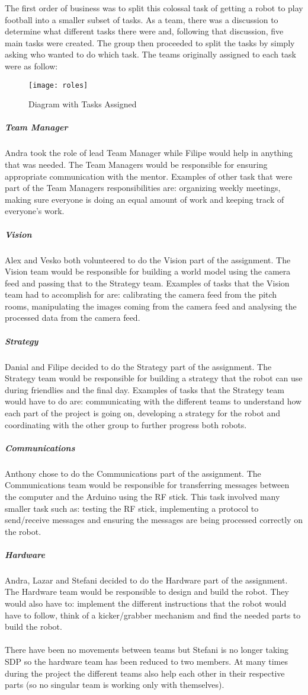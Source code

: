 The first order of business was to split this colossal task of getting a robot to play football into a smaller subset of tasks. As a team, there was a discussion to determine what different tasks there were and, following that discussion, five main tasks were created. The group then proceeded to split the tasks by simply asking who wanted to do which task. The teams originally assigned to each task were as follow:

\begin{figure}[H]
    \centering
    \texttt{[image: roles]}
    \caption{Diagram with Tasks Assigned}
    \label{fig:roles}
\end{figure}

\subparagraph{Team Manager}
Andra took the role of lead Team Manager while Filipe would help in anything that was needed. The Team Managers would be responsible for ensuring appropriate communication with the mentor. Examples of other task that were part of the Team Managers responsibilities are: organizing weekly meetings, making sure everyone is doing an equal amount of work and keeping track of everyone's work.


\subparagraph{Vision}
Alex and Vesko both volunteered to do the Vision part of the assignment. The Vision team would be responsible for building a world model using the camera feed and passing that to the Strategy team. Examples of tasks that the Vision team had to accomplish for are: calibrating the camera feed from the pitch rooms, manipulating the images coming from the camera feed and analysing the processed data from the camera feed.

\subparagraph{Strategy}
Danial and Filipe decided to do the Strategy part of the assignment. The Strategy team would be responsible for building a strategy that the robot can use during friendlies and the final day. Examples of tasks that the Strategy team would have to do are: communicating with the different teams to understand how each part of the project is going on, developing a strategy for the robot and coordinating with the other group to further progress both robots.

\subparagraph{Communications}
Anthony chose to do the Communications part of the assignment. The Communications team would be responsible for transferring messages between the computer and the Arduino using the RF stick. This task involved many smaller task such as: testing the RF stick, implementing a protocol to send/receive messages and ensuring the messages are being processed correctly on the robot.

\subparagraph{Hardware}
Andra, Lazar and Stefani decided to do the Hardware part of the assignment. The Hardware team would be responsible to design and build the robot. They would also have to: implement the different instructions that the robot would have to follow, think of a kicker/grabber mechanism and find the needed parts to build the robot.
\\ \\
There have been no movements between teams but Stefani is no longer taking SDP so the hardware team has been reduced to two members. At many times during the project the different teams also help each other in their respective parts (so no singular team is working only with themselves).